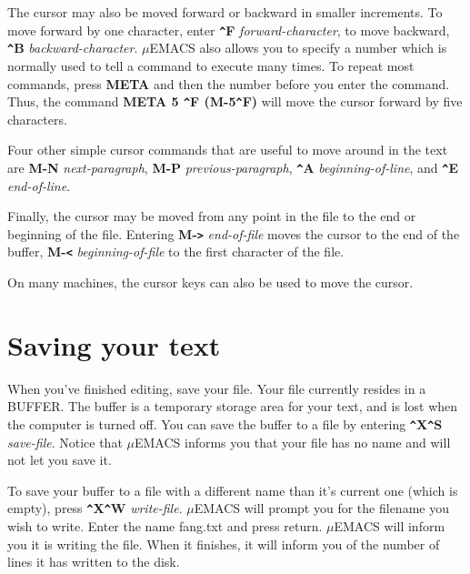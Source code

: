 The cursor may also be moved forward or backward in smaller increments.
To move forward by one character, enter {\bf \verb+^+F} {\it
forward-character}, to move backward, {\bf \verb+^+B} {\it
backward-character}. $\mu$EMACS also allows you to specify a number
which is normally used to tell a command to execute many times. To
repeat most commands, press {\bf META} and then the number before you
enter the command. Thus, the command {\bf META 5 \verb+^+F
(M-5\verb+^+F)} will move the cursor forward by five characters.

Four other simple cursor commands that are useful to move around in the
text are {\bf M-N} {\it next-paragraph}, {\bf M-P} {\it
previous-paragraph}, {\bf \verb+^+A} {\it beginning-of-line}, and {\bf
\verb+^+E} {\it end-of-line}.

Finally, the cursor may be moved from any point in the file to the end
or beginning of the file. Entering {\bf M-\verb+>+} {\it end-of-file}
moves the cursor to the end of the buffer, {\bf M-\verb+<+} {\it
beginning-of-file} to the first character of the file.

On many machines, the cursor keys can also be used to move the cursor.

\section{Saving your text}

When you've finished editing, save your file. Your file currently
resides in a BUFFER. The buffer is a temporary storage area for your
text, and is lost when the computer is turned off. You can save the
buffer to a file by entering {\bf \verb+^+X\verb+^+S} {\it save-file}.
Notice that $\mu$EMACS informs you that your file has no name and will
not let you save it.

To save your buffer to a file with a different name than it's current
one (which is empty), press {\bf \verb+^+X\verb+^+W} {\it write-file}.
$\mu$EMACS will prompt you for the filename you wish to write. Enter
the name fang.txt and press return. $\mu$EMACS will inform you it is
writing the file. When it finishes, it will inform you of the number of
lines it has written to the disk.


